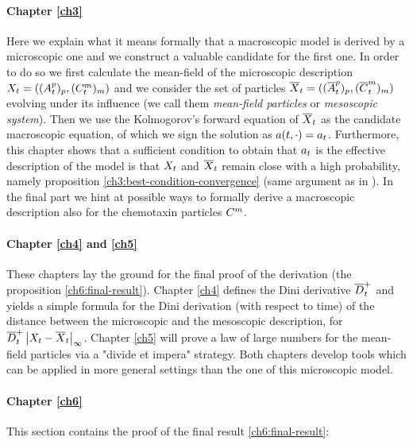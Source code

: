 \paragraph{Chapter \ref{ch3}} Here we explain what it means formally that a macroscopic model is derived by a microscopic one and we construct a valuable candidate for the first one.
In order to do so we first calculate the mean-field of the microscopic description $X_t = ( (A_t^p)_p, (C_t^m)_m)$ and we consider the set of \iid particles $\overline{X}_t = ( (\overline{A}_t^p)_p, (\overline{C}_t^m)_m)$ evolving under its influence (we call them \emph{mean-field particles} or \emph{mesoscopic system}).
Then we use the Kolmogorov's forward equation of $\overline{X}_t$ as the candidate macroscopic equation, of which we sign the solution as $a(t,\cdot) = a_t$.
Furthermore, this chapter shows that a sufficient condition to obtain that $a_t$ is the effective description of the model is that $X_t$ and $\overline{X}_t$ remain close with a high probability, namely proposition \ref{ch3:best-condition-convergence} (same argument as in \cite{ana}).
In the final part we hint at possible ways to formally derive a macroscopic description also for the chemotaxin particles $C^m$.

\paragraph{Chapter \ref{ch4} and \ref{ch5}} These chapters lay the ground for the final proof of the derivation (\ie the proposition \ref{ch6:final-result}).
Chapter \ref{ch4} defines the Dini derivative $\overline{D}_t^+$ and yields a simple formula for the Dini derivation (with respect to time) of the distance between the microscopic and the mesoscopic description, \ie for $\overline{D}_t^+ \left| X_t -\overline{X}_t \right|_\infty$.
Chapter \ref{ch5} will prove a law of large numbers for the mean-field particles via a "divide et impera" strategy.
Both chapters develop tools which can be applied in more general settings than the one of this microscopic model.

\paragraph{Chapter \ref{ch6}} This section contains the proof of the final result \ref{ch6:final-result}:

